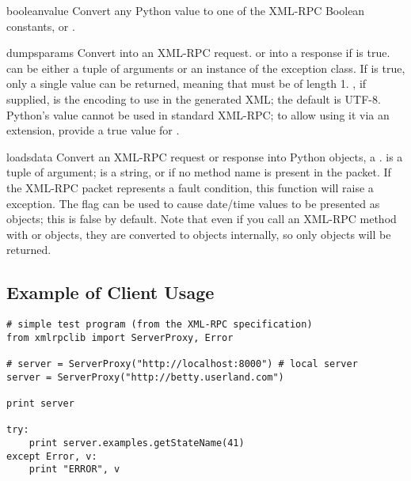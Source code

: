 \begin{funcdesc}{boolean}{value}
Convert any Python value to one of the XML-RPC Boolean constants,
 or .
\end{funcdesc}

\begin{funcdesc}{dumps}{params}
Convert  into an XML-RPC request.
or into a response if  is true.
 can be either a tuple of arguments or an instance of the 
 exception class.  If  is true,
only a single value can be returned, meaning that  must be of length 1.
, if supplied, is the encoding to use in the generated
XML; the default is UTF-8.  Python's  value cannot be
used in standard XML-RPC; to allow using it via an extension, 
provide a true value for .
\end{funcdesc}

\begin{funcdesc}{loads}{data}
Convert an XML-RPC request or response into Python objects, a
.   is a tuple of argument; 
is a string, or  if no method name is present in the packet.
If the XML-RPC packet represents a fault condition, this
function will raise a  exception.
The  flag can be used to cause date/time values to be
presented as  objects; this is false
by default.
Note that even if you call an XML-RPC method with
 or 
objects, they are converted to  objects internally, so only
{} objects will be returned.

\end{funcdesc}



\subsection{Example of Client Usage \label{xmlrpc-client-example}}

\begin{verbatim}
# simple test program (from the XML-RPC specification)
from xmlrpclib import ServerProxy, Error

# server = ServerProxy("http://localhost:8000") # local server
server = ServerProxy("http://betty.userland.com")

print server

try:
    print server.examples.getStateName(41)
except Error, v:
    print "ERROR", v
\end{verbatim}

